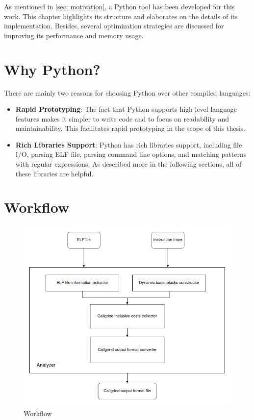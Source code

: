 As mentioned in \cref{sec: motivation}, a Python tool has been developed for this work. This chapter highlights its structure and elaborates on the details of its implementation. Besides, several optimization strategies are discussed for improving its performance and memory usage.

\section{Why Python?}

There are mainly two reasons for choosing Python over other compiled languages:

\begin{itemize}
    \item \textbf{Rapid Prototyping}: The fact that Python supports high-level language features makes it simpler to write code and to focus on readability and maintainability. This facilitates rapid prototyping in the scope of this thesis.
    \item \textbf{Rich Libraries Support}: Python has rich libraries support, including file I/O, parsing ELF file, parsing command line options, and matching patterns with regular expressions. As described more in the following sections, all of these libraries are helpful.
\end{itemize}

\section{Workflow}

\begin{figure}[ht]
    \centering
    \includegraphics[width=\linewidth]{figures/Analyzer_structure.png}
    \caption{Workflow}
    \label{fig:analyzer_structure}
\end{figure}

